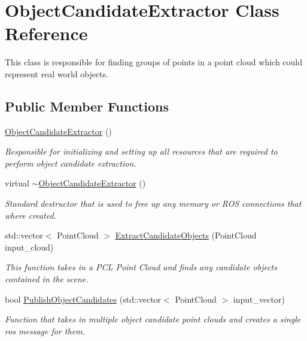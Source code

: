 \hypertarget{class_object_candidate_extractor}{\section{\-Object\-Candidate\-Extractor \-Class \-Reference}
\label{class_object_candidate_extractor}
}


\-This class is responsible for finding groups of points in a point cloud which could represent real world objects.  


\subsection*{\-Public \-Member \-Functions}
\begin{DoxyCompactItemize}
\item 
\hypertarget{class_object_candidate_extractor_a41916df0d27e926a337fff6e7e762010}{\hyperlink{class_object_candidate_extractor_a41916df0d27e926a337fff6e7e762010}{\-Object\-Candidate\-Extractor} ()}\label{class_object_candidate_extractor_a41916df0d27e926a337fff6e7e762010}

\begin{DoxyCompactList}\small\item\em \-Responsible for initializing and setting up all resources that are required to perform object candidate extraction. \end{DoxyCompactList}\item 
\hypertarget{class_object_candidate_extractor_ad1aa824172a7d2e6002d5d7e3104d5d3}{virtual \hyperlink{class_object_candidate_extractor_ad1aa824172a7d2e6002d5d7e3104d5d3}{$\sim$\-Object\-Candidate\-Extractor} ()}\label{class_object_candidate_extractor_ad1aa824172a7d2e6002d5d7e3104d5d3}

\begin{DoxyCompactList}\small\item\em \-Standard destructor that is used to free up any memory or \-R\-O\-S connections that where created. \end{DoxyCompactList}\item 
std\-::vector$<$ \-Point\-Cloud $>$ \hyperlink{class_object_candidate_extractor_a6a4adbcec19f94bc6073a4b2c2fa6f66}{\-Extract\-Candidate\-Objects} (\-Point\-Cloud input\-\_\-cloud)
\begin{DoxyCompactList}\small\item\em \-This function takes in a \-P\-C\-L \-Point \-Cloud and finds any candidate objects contained in the scene. \end{DoxyCompactList}\item 
bool \hyperlink{class_object_candidate_extractor_ab8848f6d86f7d7798ea30c2e04ae8b59}{\-Publish\-Object\-Candidates} (std\-::vector$<$ \-Point\-Cloud $>$ input\-\_\-vector)
\begin{DoxyCompactList}\small\item\em \-Function that takes in multiple object candidate point clouds and creates a single ros message for them. \end{DoxyCompactList}\end{DoxyCompactItemize}
